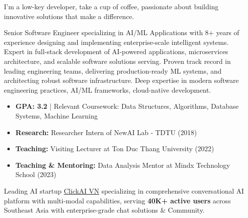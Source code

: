\documentclass[10pt,a4paper,ragged2e,withhyper]{altacv}
\begin{document}


\makecvheader

\begin{minipage}{\linewidth}
\justifying
I'm a low-key developer, take a cup of coffee, passionate about building innovative solutions that make a difference.

Senior Software Engineer specializing in AI/ML Applications with 8+ years of experience designing and implementing enterprise-scale intelligent systems. Expert in full-stack development of AI-powered applications, microservices architecture, and scalable software solutions serving. Proven track record in leading engineering teams, delivering production-ready ML systems, and architecting robust software infrastructure. Deep expertise in modern software engineering practices, AI/ML frameworks, cloud-native development.
\end{minipage}

\begin{itemize}
	\item \textbf{GPA: 3.2} | Relevant Coursework: Data Structures, Algorithms, Database Systems, Machine Learning
  \item \textbf{Research:} Researcher Intern of NewAI Lab - TDTU (2018)
  \item \textbf{Teaching:} Visiting Lecturer at Ton Duc Thang University (2022)
  \item \textbf{Teaching \& Mentoring:} Data Analysis Mentor at Mindx Technology School (2023)
\end{itemize}



\begin{minipage}{\linewidth}
\justifying
Leading AI startup \href{http://clickai.vn}{ClickAI VN} specializing in comprehensive conversational AI platform with multi-modal capabilities, serving \textbf{40K+ active users} across Southeast Asia with enterprise-grade chat solutions \& Community.
\end{minipage}
\end{document}
